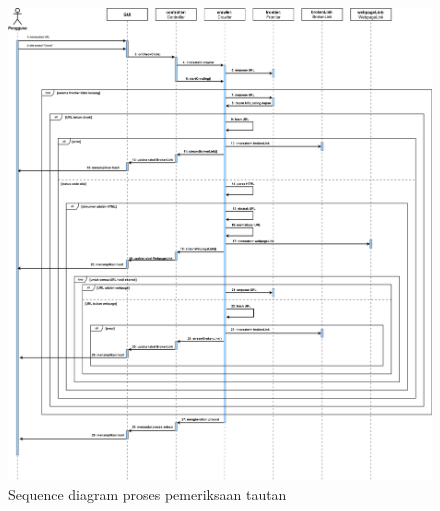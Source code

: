 \begin{figure}[H]
    \centering
    \includegraphics[width=1\textwidth]{Gambar/040200-sequence-diagram.png}
    \caption{Sequence diagram proses pemeriksaan tautan}
    \label{fig:sequence-crawl}
\end{figure}